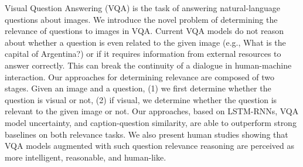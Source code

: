 Visual Question Answering (VQA) is the task of answering natural-language questions about images. We introduce the novel problem of determining the relevance of questions to images in VQA. Current VQA models do not reason about whether a question is even related to the given image (e.g., What is the capital of Argentina?) or if it requires information from external resources to answer correctly. This can break the continuity of a dialogue in human-machine interaction. Our approaches for determining relevance are composed of two stages. Given an image and a question, (1) we first determine whether the question is visual or not, (2) if visual, we determine whether the question is relevant to the given image or not. Our approaches, based on LSTM-RNNs, VQA model uncertainty, and caption-question similarity, are able to outperform strong baselines on both relevance tasks. We also present human studies showing that VQA models augmented with such question relevance reasoning are perceived as more intelligent, reasonable, and human-like.
